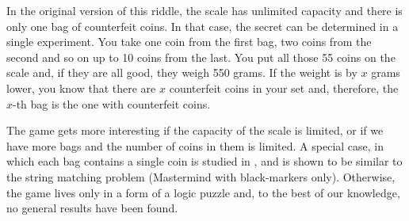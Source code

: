 In the original version of this riddle, the scale has unlimited capacity and
  there is only one bag of counterfeit coins.
In that case, the secret can be determined in a single experiment.
You take one coin from the first bag, two coins from the second and so on up to
  10 coins from the last.
You put all those 55 coins on the scale and, if they are all good,
  they weigh 550 grams.
If the weight is by $x$ grams lower, you know that there are $x$ counterfeit
  coins in your set and, therefore,
  the $x$-th bag is the one with counterfeit coins.

The game gets more interesting if the capacity of the scale is limited, or
  if we have more bags and the number of coins in them is limited.
A special case, in which each bag contains a single coin is
  studied in \cite{erdos-two}, and is shown to be similar to the
  string matching problem (Mastermind with black-markers only).
Otherwise, the game lives only in a form of a logic puzzle and,
  to the best of our knowledge, no general results have been found.
